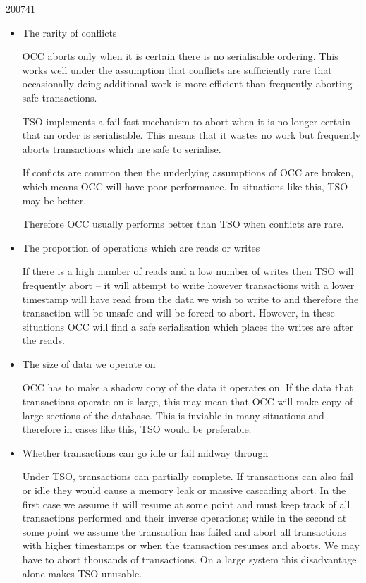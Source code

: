 \documentclass[10pt,\jkfside,a4paper]{article}
\begin{document}
\begin{examquestion}{2007}{4}{1}
\begin{enumerate}[label=(\alph*)]
\begin{itemize}

\item The rarity of conflicts

OCC aborts only when it is certain there is no serialisable ordering. This
works well under the assumption that conflicts are sufficiently rare that
occasionally doing additional work is more efficient than frequently
aborting safe transactions.

TSO implements a fail-fast mechanism to abort when it is no longer certain
that an order is serialisable. This means that it wastes no work but
frequently aborts transactions which are safe to serialise.

If conficts are common then the underlying assumptions of OCC are broken,
which means OCC will have poor performance. In situations like this, TSO may
be better.

Therefore OCC usually performs better than TSO when conflicts are rare.

\item The proportion of operations which are reads or writes

If there is a high number of reads and a low number of writes then TSO will
frequently abort -- it will attempt to write however transactions with a
lower timestamp will have read from the data we wish to write to and
therefore the transaction will be unsafe and will be forced to abort.
However, in these situations OCC will find a safe serialisation which places
the writes are after the reads.

\item The size of data we operate on

OCC has to make a shadow copy of the data it operates on. If the data that
transactions operate on is large, this may mean that OCC will make copy of
large sections of the database. This is inviable in many situations and
therefore in cases like this, TSO would be preferable.

\item Whether transactions can go idle or fail midway through

Under TSO, transactions can partially complete. If transactions can also
fail or idle they would cause a memory leak or massive cascading abort. In the
first case we assume it will resume at some point and must keep track of all
transactions performed and their inverse operations; while in the second at
some point we assume the transaction has failed and abort all transactions
with higher timestamps or when the transaction resumes and aborts. We may
have to abort thousands of transactions. On a large system this disadvantage
alone makes TSO unusable.


\end{itemize}
\end{enumerate}
\end{examquestion}
\end{document}
